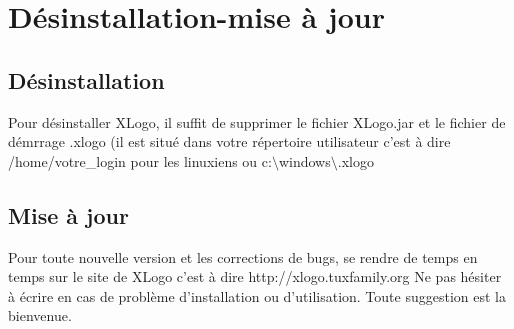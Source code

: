 \chapter{Désinstallation-mise à jour}
\section{Désinstallation}\label{fichier_perso}
Pour désinstaller XLogo, il suffit de supprimer le fichier XLogo.jar et le fichier de démrrage .xlogo (il est situé dans votre répertoire utilisateur c'est à dire /home/votre\_login pour les linuxiens ou c:$\setminus$windows$\setminus$.xlogo
 \section{Mise à jour}
Pour toute nouvelle version et les corrections de bugs, se rendre de temps en temps sur le site de XLogo c'est à dire http://xlogo.tuxfamily.org
Ne pas hésiter à écrire en cas de problème d'installation ou d'utilisation. Toute suggestion est la bienvenue.
